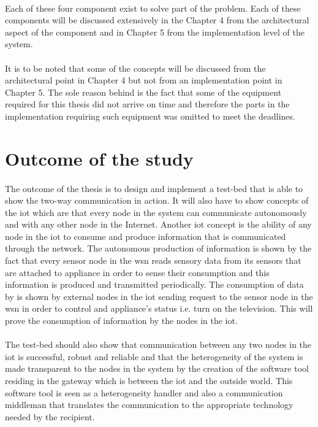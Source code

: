 \documentclass[oneside,12pt,a4paper,final]{book}
\begin{document}
\paragraph{}
Each of these four component exist to solve part of the problem. Each of these components will be discussed extensively in the Chapter 4 from the architectural aspect of the component and in Chapter 5 from the implementation level of the system. 
\paragraph{}
It is to be noted that some of the concepts will be discussed from the architectural point in Chapter 4 but not from an implementation point in Chapter 5. The sole reason behind is the fact that some of the equipment required for this thesis did not arrive on time and therefore the parts in the implementation requiring such equipment was omitted to meet the deadlines.
\section{Outcome of the study}
\paragraph{}
The outcome of the thesis is to design and implement a test-bed that is able to show the two-way communication in action. It will also have to show concepts of the \gls{iot} which are that every node in the system can communicate autonomously and with any other node in the Internet. Another \gls{iot} concept is the ability of any node in the \gls{iot} to consume and produce information that is communicated through the network. The autonomous production of information is shown by the fact that every sensor node in the \gls{wsn} reads sensory data from its sensors that are attached to appliance in order to sense their consumption and this information is produced and transmitted periodically. The consumption of data by is shown by external nodes in the \gls{iot} sending request to the sensor node in the \gls{wsn} in order to control and appliance's status i.e. turn on the television. This will prove the consumption of information by the nodes in the \gls{iot}.
\paragraph{}
The test-bed should also show that communication between any two nodes in the \gls{iot} is successful, robust and reliable and that the heterogeneity of the system is made transparent to the nodes in the system by the creation of the software tool residing in the gateway which is between the \gls{iot} and the outside world. This software tool is seen as a heterogeneity handler and also a communication middleman that translates the communication to the appropriate technology needed by the recipient.
\end{document}
